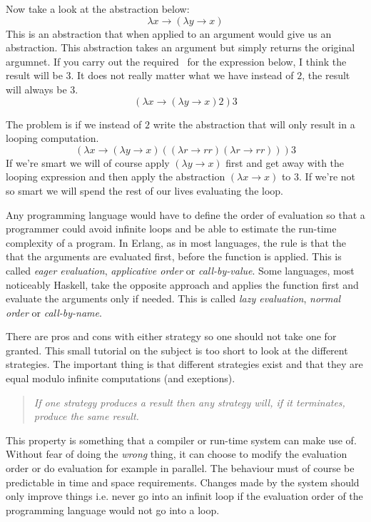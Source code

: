 \documentclass[a4paper,11pt]{article}
\begin{document}
Now take a look at the abstraction below:
$$\lambda x \rightarrow (\lambda y \rightarrow x)$$ 
This is an abstraction that when applied to an argument would give us
an abstraction. This abstraction takes an argument but simply returns
the original argumnet. If you carry out the required \betar\ for the
expression below, I think the result will be $3$. It does not really
matter what we have instead of $2$, the result will always be $3$.
$$(\lambda x \rightarrow (\lambda y \rightarrow x) 2) 3$$ 


The problem is if we instead of $2$ write the abstraction that will
only result in a looping computation.
$$(\lambda x \rightarrow (\lambda y \rightarrow x) ((\lambda r \rightarrow r r)(\lambda r \rightarrow r r)) ) 3$$ 
If we're smart we will of course apply $(\lambda y \rightarrow x)$
first and get away with the looping expression and then apply the
abstraction $(\lambda x \rightarrow x)$ to $3$. If we're not so smart
we will spend the rest of our lives evaluating the loop.

Any programming language would have to define the order of evaluation
so that a programmer could avoid infinite loops and be able to
estimate the run-time complexity of a program. In Erlang, as in most
languages, the rule is that the that the arguments are evaluated
first, before the function is applied. This is called {\em eager
  evaluation}, {\em applicative order} or {\em call-by-value}. Some
languages, most noticeably Haskell, take the opposite approach and
applies the function first and evaluate the arguments only if
needed. This is called {\em lazy evaluation}, {\em normal order} or
{\em call-by-name}.

There are pros and cons with either strategy so one should not take
one for granted. This small tutorial on the subject is too short to
look at the different strategies. The important thing is that
different strategies exist and that they are equal modulo infinite
computations (and exeptions).

\begin{quotation} {\em If one strategy produces a result then any
    strategy will, if it terminates, produce the same result. }
\end{quotation}

This property is something that a compiler or run-time system can make
use of. Without fear of doing the {\em wrong} thing, it can choose to
modify the evaluation order or do evaluation for example in
parallel. The behaviour must of course be predictable in time and
space requirements. Changes made by the system should only improve
things i.e. never go into an infinit loop if the evaluation order of
the programming language would not go into a loop.
\end{document}
